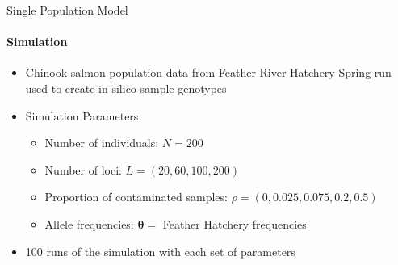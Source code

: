 \documentclass[letter,graphicx]{beamer}
\begin{document}
\begin{frame}{Single Population Model}
\framesubtitle{Simulation}
\begin{itemize}
\item Chinook salmon population data from Feather River Hatchery Spring-run used to create in silico sample genotypes 
\vspace{3mm}
\item Simulation Parameters
	\begin{itemize}
	\item Number of individuals: $N = 200$
	\vspace{1.5mm}
	\item Number of loci: $L =  (20, 60, 100, 200)$
	\vspace{1.5mm}
	\item Proportion of contaminated samples: $\rho = (0, 0.025, 0.075, 0.2, 0.5)$
	\vspace{1.5mm}
	\item Allele frequencies: $\boldsymbol{\theta} =$ Feather Hatchery frequencies 
	\end{itemize}
	\vspace{3mm}
\item 100 runs of the simulation with each set of parameters
\end{itemize}
\end{frame}
\end{document}
